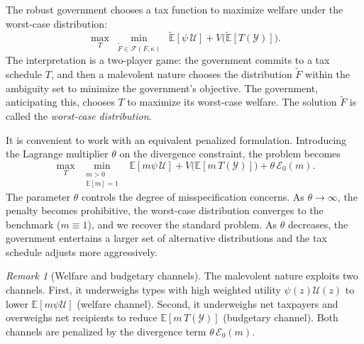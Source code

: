 \documentclass[12pt,a4paper]{article}
\theoremstyle{definition}
\theoremstyle{plain}
\theoremstyle{remark}
\newtheorem{remark}{Remark}[section]
\newcommand{\E}{\mathbb{E}}
\newcommand{\calU}{\mathcal{U}}
\begin{document}
The robust government chooses a tax function to maximize welfare under the worst-case distribution:
\begin{equation}
\label{eq:robust_tax_problem}
  \max_{T} \; \min_{\widetilde{F} \in \mathcal{F}(F,\kappa)} \;\;
  \widetilde{\E}[\psi \, \calU] + V\bigl(\widetilde{\E}[T(\mathcal{Y})]\bigr).
\end{equation}
The interpretation is a two-player game: the government commits to a tax schedule $T$, and then a malevolent nature chooses the distribution $\widetilde{F}$ within the ambiguity set to minimize the government's objective. The government, anticipating this, chooses $T$ to maximize its worst-case welfare. The solution $\widetilde{F}$ is called the \emph{worst-case distribution}.

It is convenient to work with an equivalent penalized formulation. Introducing the Lagrange multiplier $\theta$ on the divergence constraint, the problem becomes
\begin{equation}
\label{eq:robust_penalized}
  \max_{T} \; \min_{\substack{m > 0 \\ \E[m] = 1}} \;\;
  \E[m \psi \, \calU] + V\bigl(\E[m\, T(\mathcal{Y})]\bigr) + \theta \, \mathcal{E}_0(m).
\end{equation}
The parameter $\theta$ controls the degree of misspecification concerns. As $\theta \to \infty$, the penalty becomes prohibitive, the worst-case distribution converges to the benchmark ($m \equiv 1$), and we recover the standard problem. As $\theta$ decreases, the government entertains a larger set of alternative distributions and the tax schedule adjusts more aggressively.

\begin{remark}[Welfare and budgetary channels]
The malevolent nature exploits two channels. First, it underweighs types with high weighted utility $\psi(z)\calU(z)$ to lower $\E[m\psi\calU]$ (welfare channel). Second, it underweighs net taxpayers and overweighs net recipients to reduce $\E[m\,T(\mathcal{Y})]$ (budgetary channel). Both channels are penalized by the divergence term $\theta\,\mathcal{E}_0(m)$.
\end{remark}
\end{document}

